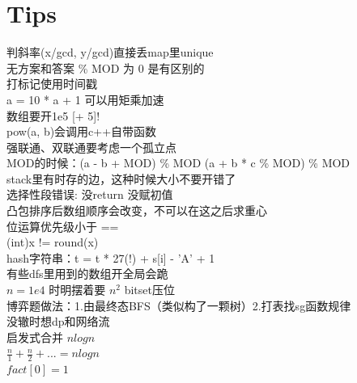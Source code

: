 \documentclass[11pt]{article}
\begin{document}
	\section{Tips}
		判斜率(x/gcd, y/gcd)直接丢map里unique\\
		无方案和答案 \% MOD 为 0 是有区别的\\
		打标记使用时间戳\\
		a = 10 * a + 1 可以用矩乘加速\\
		数组要开1e5 [+ 5]!\\
		pow(a, b)会调用c++自带函数\\
		强联通、双联通要考虑一个孤立点\\
		MOD的时候：(a - b + MOD) \% MOD (a + b * c \% MOD) \% MOD\\
		stack里有时存的边，这种时候大小不要开错了\\
		选择性段错误: 没return 没赋初值\\
		凸包排序后数组顺序会改变，不可以在这之后求重心\\
		位运算优先级小于 ==\\
		(int)x != round(x)\\
		hash字符串：t = t * 27(!) + s[i] - 'A' + 1\\
		有些dfs里用到的数组开全局会跪\\
		$n = 1e4$ 时明摆着要 $n^2$ bitset压位\\
		博弈题做法：1.由最终态BFS（类似构了一颗树）2.打表找sg函数规律\\
		没辙时想dp和网络流\\
		启发式合并 $nlogn$\\
		$\frac{n}{1}+\frac{n}{2} + ... = nlogn$\\
		$fact[0] = 1$

	
\end{document}
